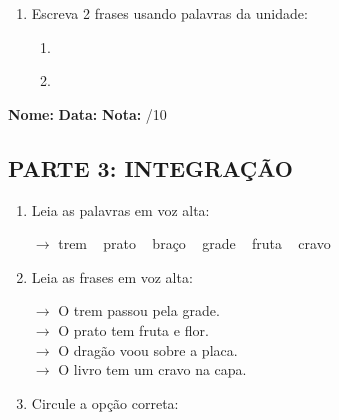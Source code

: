 \begin{exercicio}
\begin{enumerate}[resume]
  \item Escreva 2 frases usando palavras da unidade:
  \begin{enumerate}[label=\alph*)]
    \item \underline{\hspace{8cm}}
    \item \underline{\hspace{8cm}}
  \end{enumerate}

\end{enumerate}

\end{exercicio}



\begin{exercicio}

\noindent\textbf{Nome:} \underline{\hspace{3.2cm}} \quad \textbf{Data:} \underline{\hspace{1.6cm}} \quad \textbf{Nota:} \underline{\hspace{0.9cm}}/10


\subsection*{PARTE 3: INTEGRAÇÃO}

\begin{enumerate}[resume]

  \item Leia as palavras em voz alta:
  \begin{center}
  $\rightarrow$ trem ~ prato ~ braço ~ grade ~ fruta ~ cravo
  \end{center}

  \item Leia as frases em voz alta:
  \begin{center}
  $\rightarrow$ O trem passou pela grade.\\
  $\rightarrow$ O prato tem fruta e flor.\\
  $\rightarrow$ O dragão voou sobre a placa.\\
  $\rightarrow$ O livro tem um cravo na capa.\\
  \end{center}

  \item Circule a opção correta:
  \begin{enumerate}[label=(\alph*)]


\end{enumerate}
\end{enumerate}
\end{exercicio}
